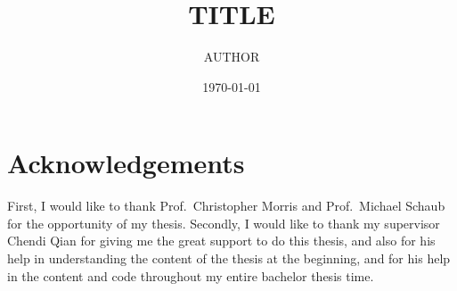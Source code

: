 \documentclass[
    numbers=noenddot,
    parskip=half-,
    fontsize=12pt,
    paper=a4,
    oneside,
    titlepage,
    bibliography=totoc,
    chapterprefix=false,
    headheight=30pt,
    footheight=30pt
]{scrbook}
\title{TITLE}
\author{AUTHOR}
\date{\today}
\begin{document}
\frontmatter

% 

\tableofcontents
\newpage

% 
\cleardoublepage
{}
{}
\chapter*{Acknowledgements}
First, I would like to thank Prof.~Christopher Morris and Prof.~Michael Schaub for the opportunity of my thesis. 
Secondly, I would like to thank my supervisor Chendi Qian for giving me the great support to do this thesis, and also for his help in understanding the content of the thesis at the beginning, and for his help in the content and code throughout my entire bachelor thesis time.


\thispagestyle{empty}
\cleardoublepage
{}
{}
\listoffigures
\newpage

\thispagestyle{empty}
\cleardoublepage
{}
{}
\listoftables
\newpage


\cleardoublepage
{}

% 




\mainmatter







\begin{appendices}
    
\end{appendices}
\newpage


\backmatter

\printbibliography

% 
\end{document}
